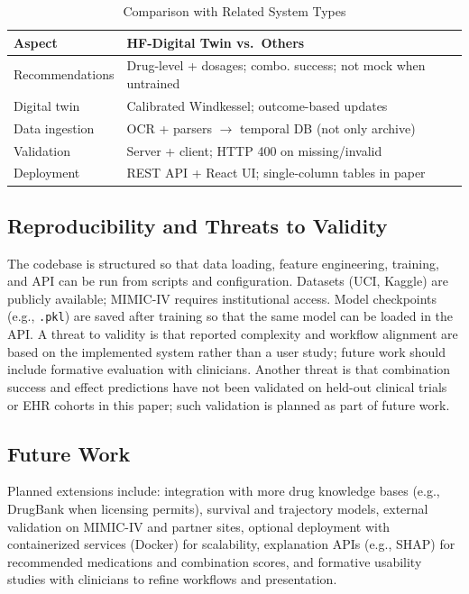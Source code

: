 \documentclass[conference]{IEEEtran}
\begin{document}
\begin{table}[t]
\caption{Comparison with Related System Types}
\label{tab:comparison}
\centering
\footnotesize
\begin{tabular}{@{}p{}p{}@{}}
\toprule
\textbf{Aspect} & \textbf{HF-Digital Twin vs.\ Others} \\
\midrule
Recommendations & Drug-level + dosages; combo. success; not mock when untrained \\
Digital twin & Calibrated Windkessel; outcome-based updates \\
Data ingestion & OCR + parsers $\to$ temporal DB (not only archive) \\
Validation & Server + client; HTTP 400 on missing/invalid \\
Deployment & REST API + React UI; single-column tables in paper \\
\bottomrule
\end{tabular}
\end{table}

\subsection{Reproducibility and Threats to Validity}
The codebase is structured so that data loading, feature engineering, training, and API can be run from scripts and configuration. Datasets (UCI, Kaggle) are publicly available; MIMIC-IV requires institutional access. Model checkpoints (e.g., \texttt{.pkl}) are saved after training so that the same model can be loaded in the API. A threat to validity is that reported complexity and workflow alignment are based on the implemented system rather than a user study; future work should include formative evaluation with clinicians. Another threat is that combination success and effect predictions have not been validated on held-out clinical trials or EHR cohorts in this paper; such validation is planned as part of future work.

\subsection{Future Work}
Planned extensions include: integration with more drug knowledge bases (e.g., DrugBank when licensing permits), survival and trajectory models, external validation on MIMIC-IV and partner sites, optional deployment with containerized services (Docker) for scalability, explanation APIs (e.g., SHAP) for recommended medications and combination scores, and formative usability studies with clinicians to refine workflows and presentation.
\end{document}
